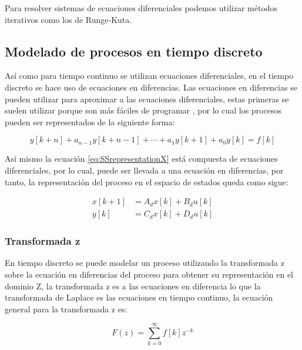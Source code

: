             Para resolver sistemas de ecuaciones diferenciales podemos utilizar métodos iterativos como los de Runge-Kuta.

    \subsection{Modelado de procesos en tiempo discreto}

        Así como para tiempo continuo se utilizan ecuaciones diferenciales, en el tiempo discreto se hace uso de ecuaciones en diferencias. Las ecuaciones en diferencias se pueden utilizar para aproximar a las ecuaciones diferenciales, estas primeras se suelen utilizar porque son más fáciles de programar \Parencite{kuo1996sistemas}, por lo cual los procesos pueden ser representados de la siguiente forma:
        
        \begin{equation}\label{eq:EqEnDiferencias}
            y[k+n] + a_{n-1}y[k+n-1] + \cdots + a_1 y[k+1] + a_0 y[k] = f[k] 
        \end{equation}
        
        Así mismo la ecuación \cref{eq:SSrepresentationX} está compuesta de ecuaciones diferenciales, por lo cual, puede ser llevada a una ecuación en diferencias, por tanto, la representación del proceso en el espacio de estados queda como sigue:

        \begin{align}\label{eq:SSdiscreto}
            x[k+1] &= A_d x[k] + B_d u[k] \\
            y[k] &= C_d x[k] + D_d u[k]
        \end{align}

        \subsubsection{Transformada z}
		
			En tiempo discreto se puede modelar un proceso utilizando la transformada z sobre la ecuación en diferencias del proceso para obtener su representación en el dominio Z, la transformada z es a las ecuaciones en diferencia lo que la transformada de Laplace es las ecuaciones en tiempo continuo, la ecuación general para la transformada z es:
			
			\begin{equation}\label{eq:Ztransform}
				F(z)= \sum\limits_{k=0}^{\infty}f[k]z^{-k}
			\end{equation}

